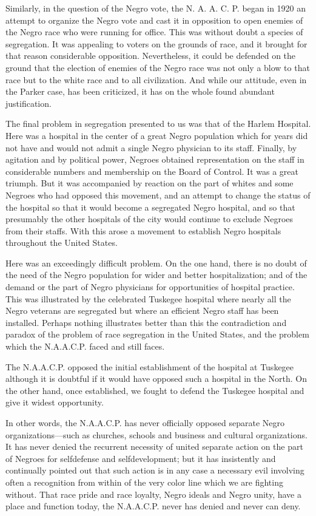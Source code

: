 \documentclass[letterpaper,10pt,english]{jupyterBook}
\begin{document}
\sphinxAtStartPar
Similarly, in the question of the Negro vote, the N. A. A. C. P. began in 1920 an attempt to organize the Negro vote and cast it in opposition to open enemies of the Negro race who were running for office. This was without doubt a species of segregation. It was appealing to voters on the grounds of race, and it brought for that reason considerable opposition. Nevertheless, it could be defended on the ground that the election of enemies of the Negro race was not only a blow to that race but to the white race and to all civilization. And while our attitude, even in the Parker case, has been criticized, it has on the whole found abundant justification.

\sphinxAtStartPar
The final problem in segregation presented to us was that of the Harlem Hospital. Here was a hospital in the center of a great Negro population which for years did not have and would not admit a single Negro physician to its staff. Finally, by agitation and by political power, Negroes obtained representation on the staff in considerable numbers and membership on the Board of Control. It was a great triumph. But it was accompanied by reaction on the part of whites and some Negroes who had opposed this movement, and an attempt to change the status of the hospital so that it would become a segregated Negro hospital, and so that presumably the other hospitals of the city would continue to exclude Negroes from their staffs. With this arose a movement to establish Negro hospitals throughout the United States.

\sphinxAtStartPar
Here was an exceedingly difficult problem. On the one hand, there is no doubt of the need of the Negro population for wider and better hospitalization; and of the demand or the part of Negro physicians for opportunities of hospital practice. This was illustrated by the celebrated Tuskegee hospital where nearly all the Negro veterans are segregated but where an efficient Negro staff has been installed. Perhaps nothing illustrates better than this the contradiction and paradox of the problem of race segregation in the United States, and the problem which the N.A.A.C.P. faced and still faces.

\sphinxAtStartPar
The N.A.A.C.P. opposed the initial establishment of the hospital at Tuskegee although it is doubtful if it would have opposed such a hospital in the North. On the other hand, once established, we fought to defend the Tuskegee hospital and give it widest opportunity.

\sphinxAtStartPar
In other words, the N.A.A.C.P. has never officially opposed separate Negro organizations—such as churches, schools and business and cultural organizations. It has never denied the recurrent necessity of united separate action on the part of Negroes for self\sphinxhyphen{}defense and self\sphinxhyphen{}development; but it has insistently and continually pointed out that such action is in any case a necessary evil involving often a recognition from within of the very color line which we are fighting without. That race pride and race loyalty, Negro ideals and Negro unity, have a place and function today, the N.A.A.C.P. never has denied and never can deny.
\end{document}
